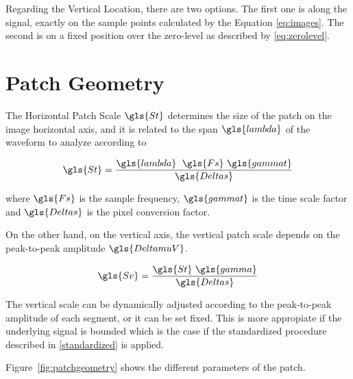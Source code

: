 Regarding the Vertical Location, there are two options.  The first one is along the signal, exactly on the sample points calculated by the Equation \ref{eq:images}.  The second is on a fixed position over the zero-level as described by \ref{eq:zerolevel}.

\section{Patch Geometry}



The Horizontal Patch Scale $\gls{St}$ determines the size of the patch on the image horizontal axis, and it is related to the span $\gls{lambda}$ of the waveform to analyze according to

\begin{equation}
\gls{St} = \frac{ \gls{lambda} \;  \  \gls{Fs} \ \gls{gammat} }{\gls{Deltas}}
\label{eq:horizontalpatchscale}
\end{equation}

\noindent where $\gls{Fs}$ is the sample frequency, $\gls{gammat}$ is the time scale factor and $\gls{Deltas}$ is the pixel conversion factor.

On the other hand, on the vertical axis, the vertical patch scale depends on the peak-to-peak amplitude $\gls{DeltamuV}$.

\begin{equation}
\gls{Sv} = \frac{\gls{St} \ \gls{gamma}}{\gls{Deltas}} 
\label{eq:mapping1}
\end{equation}

The vertical scale can be dynamically adjusted according to the peak-to-peak amplitude of each segment, or it can be set fixed.  This is more appropiate if the underlying signal is bounded which is the case if the standardized procedure described in \ref{standardized} is applied.

Figure~\ref{fig:patchgeometry} shows the different parameters of the patch.


